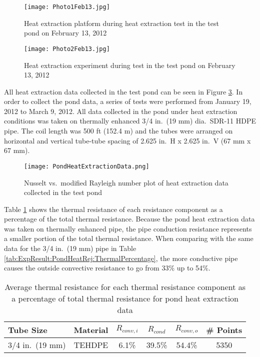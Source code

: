 	\begin{figure}
		\centering
		\texttt{[image: Photo1Feb13.jpg]}
		\caption[Heat extraction platform in pond during test]{Heat extraction platform during heat extraction test in the test pond on February 13, 2012}
		\label{fig:ExpResult:HeatExtr:PondData:Photo1Feb13}
	\end{figure}	
	
	\begin{figure}
		\centering
		\texttt{[image: Photo2Feb13.jpg]}
		\caption[Heat extraction experiment in pond during test]{Heat extraction experiment during test in the test pond on February 13, 2012}
		\label{fig:ExpResult:HeatExtr:PondData:Photo2Feb13}
	\end{figure}	

All heat extraction data collected in the test pond can be seen in Figure \ref{fig:ExpResult:HeatExtr:PondData:PondHeatExtractionData}. In order to collect the pond data, a series of tests were performed from January 19, 2012 to March 9, 2012. All data collected in the pond under heat extraction conditions was taken on  thermally enhanced 3/4 in.\ (19 mm) dia.\ SDR-11 HDPE pipe. The coil length was 500 ft (152.4 m) and the tubes were arranged on horizontal and vertical tube-tube spacing of 2.625 in.\ H x 2.625 in.\ V (67 mm x 67 mm). 
	
	\begin{figure}
		\centering
		\texttt{[image: PondHeatExtractionData.png]}
		\caption[Pond heat extraction data taken on February 13, 2011]{Nusselt vs.\ modified Rayleigh number plot of heat extraction data collected in the test pond}
		\label{fig:ExpResult:HeatExtr:PondData:PondHeatExtractionData}
	\end{figure}
	
Table \ref{tab:ExpResult:PondHeatExtr:ThermalPercentage} shows the thermal resistance of each resistance component as a percentage of the total thermal resistance. Because the pond heat extraction data was taken on thermally enhanced pipe, the pipe conduction resistance represents a smaller portion of the total thermal resistance. When comparing with the same data for the 3/4 in.\ (19 mm) pipe in Table \ref{tab:ExpResult:PondHeatRej:ThermalPercentage}, the more conductive pipe causes the outside convective resistance to go from 33\% up to 54\%.

	\begin{table}[h]
		\centering
		\caption[Average thermal resistance percentages for pond heat extraction data]{Average thermal resistance for each thermal resistance component as a percentage of total thermal resistance for pond heat extraction data}
		\label{tab:ExpResult:PondHeatExtr:ThermalPercentage}
		\begin{tabular}{p{3cm} c c c c c}
		\hline
		Tube Size & Material & $R_{conv,i}$ & $R_{cond}$ & $R_{conv,o}$ & \# Points\\
		\hline\hline
		3/4 in.\ (19 mm) & TEHDPE & 6.1\% & 39.5\% & 54.4\% & 5350\\
		\hline	
		\end{tabular}
	\end{table}
 

